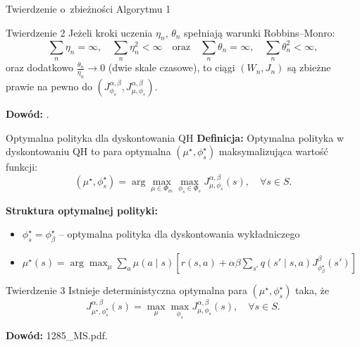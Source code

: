 \documentclass[aspectratio=169]{beamer}
\begin{document}
\begin{frame}{Twierdzenie o~zbieżności Algorytmu 1}
\begin{block}{Twierdzenie 2 \cite{eshwar2025}}
Jeżeli kroki uczenia $\eta_n$, $\theta_n$ spełniają warunki Robbins--Monro:
\[
\sum_n \eta_n = \infty, \quad \sum_n \eta_n^2 < \infty \quad \text{oraz} \quad \sum_n \theta_n = \infty, \quad \sum_n \theta_n^2 < \infty,
\]
oraz dodatkowo $\frac{\theta_n}{\eta_n} \to 0$ (dwie skale czasowe), to ciągi $(W_n, J_n)$ są zbieżne prawie na pewno do $(J^{\alpha, \beta}_{\phi_s}, J^{\alpha, \beta}_{\mu, \phi_s})$.
\end{block}

\vspace{1em}
\textbf{Dowód:} \cite{eshwar2025,borkar2008}.
\end{frame}

\begin{frame}{Optymalna polityka dla dyskontowania QH}
\textbf{Definicja:} Optymalna polityka w dyskontowaniu QH to para optymalna $(\mu^\star, \phi_s^\star)$ maksymalizująca wartość funkcji:
\[
(\mu^\star, \phi_s^\star) = \arg\max_{\mu \in \Phi_m} \max_{\phi_s \in \Phi_s} J^{\alpha, \beta}_{\mu, \phi_s}(s), \quad \forall s \in S.
\]

\vspace{0.5em}
\textbf{Struktura optymalnej polityki:}
\begin{itemize}
    \item $\phi_s^\star = \phi_\beta^\star$ -- optymalna polityka dla dyskontowania wykładniczego
    \item $\mu^\star(s) = \arg\max_{\mu}\sum\limits_{a}\mu(a\mid s) \left[ r(s, a) + \alpha \beta \sum_{s'} q(s'\mid s, a) J^{\beta}_{\phi_\beta^\star}(s') \right]$
\end{itemize}

\vspace{0.5em}
\begin{block}{Twierdzenie 3 \cite{eshwar2025}}
Istnieje deterministyczna optymalna para $(\mu^\star, \phi_s^\star)$ taka, że
\[
J^{\alpha, \beta}_{\mu^\star, \phi_s^\star}(s) = \max_{\mu} \max_{\phi_s} J^{\alpha, \beta}_{\mu, \phi_s}(s), \quad \forall s \in S.
\]
\end{block}

\vspace{0.5em}
\textbf{Dowód:} 1285\_MS.pdf.
\end{frame}
\end{document}
